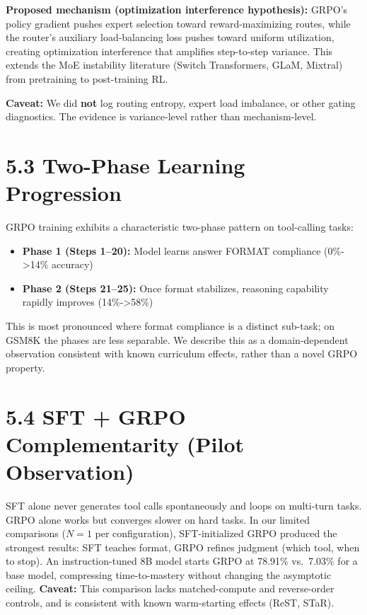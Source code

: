 \documentclass[
  american,
  11pt,
  a4paper,
  oneside]{report}
\providecommand{\tightlist}{%
  \setlength{\itemsep}{0pt}\setlength{\parskip}{0pt}}
\begin{document}
\textbf{Proposed mechanism (optimization interference hypothesis):}
GRPO's policy gradient pushes expert selection toward reward-maximizing
routes, while the router's auxiliary load-balancing loss pushes toward
uniform utilization, creating optimization interference that amplifies
step-to-step variance. This extends the MoE instability literature
(Switch Transformers, GLaM, Mixtral) from pretraining to post-training
RL.

\textbf{Caveat:} We did \textbf{not} log routing entropy, expert load
imbalance, or other gating diagnostics. The evidence is variance-level
rather than mechanism-level.

\section{5.3 Two-Phase Learning
Progression}\label{two-phase-learning-progression}

GRPO training exhibits a characteristic two-phase pattern on
tool-calling tasks:

\begin{itemize}
\tightlist
\item
  \textbf{Phase 1 (Steps 1--20):} Model learns answer FORMAT compliance
  (0\%-\textgreater14\% accuracy)
\item
  \textbf{Phase 2 (Steps 21--25):} Once format stabilizes, reasoning
  capability rapidly improves (14\%-\textgreater58\%)
\end{itemize}

This is most pronounced where format compliance is a distinct sub-task;
on GSM8K the phases are less separable. We describe this as a
domain-dependent observation consistent with known curriculum effects,
rather than a novel GRPO property.

\section{5.4 SFT + GRPO Complementarity (Pilot
Observation)}\label{sft-grpo-complementarity-pilot-observation}

SFT alone never generates tool calls spontaneously and loops on
multi-turn tasks. GRPO alone works but converges slower on hard tasks.
In our limited comparisons (\(N{=}1\) per configuration),
SFT-initialized GRPO produced the strongest results: SFT teaches format,
GRPO refines judgment (which tool, when to stop). An instruction-tuned
8B model starts GRPO at 78.91\% vs.~7.03\% for a base model, compressing
time-to-mastery without changing the asymptotic ceiling.
\textbf{Caveat:} This comparison lacks matched-compute and reverse-order
controls, and is consistent with known warm-starting effects (ReST,
STaR).
\end{document}

